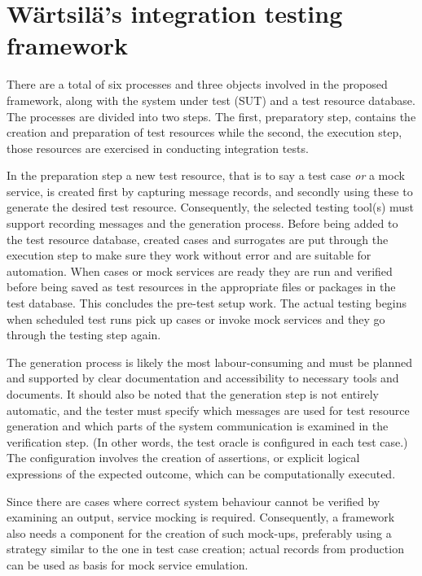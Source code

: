 \documentclass[12pt,a4paper,oneside,pdftex]{report}
\begin{document}
{\section{Wärtsilä's integration testing framework}

There are a total of six processes and three objects involved in the proposed framework, along with the system under test (SUT) and a test resource database. The processes are divided into two steps. The first, preparatory step, contains the creation and preparation of test resources while the second, the execution step, those resources are exercised in conducting integration tests.

In the preparation step a new test resource, that is to say a test case \emph{or} a mock service, is created first by capturing message records, and secondly using these to generate the desired test resource. Consequently, 
the selected testing tool(s) must support recording messages and the generation process. Before being added to the test resource database, created cases and surrogates are put through the execution step to make sure they work without error and are suitable for automation. When cases or mock services are ready they are run and verified before being saved as test resources in the appropriate files or packages in the test database. This concludes the pre-test setup work. The actual testing begins when scheduled test runs pick up cases or invoke mock services and they go through the testing step again.

The generation process is likely the most labour-consuming and must be planned and supported by clear documentation and accessibility to necessary tools and documents. It should also be noted that the generation step is not entirely automatic, and the tester must specify which messages are used for test resource generation and which parts of the system communication is examined in the verification step. (In other words, the test oracle is configured in each test case.) The configuration involves the creation of assertions, or explicit logical expressions of the expected outcome, which can be computationally executed. 

Since there are cases where correct system behaviour cannot be verified by examining an output, service mocking is required. Consequently, a framework also needs a component for the creation of such mock-ups, preferably using a strategy similar to the one in test case creation; actual records from production can be used as basis for mock service emulation.

}
\end{document}
